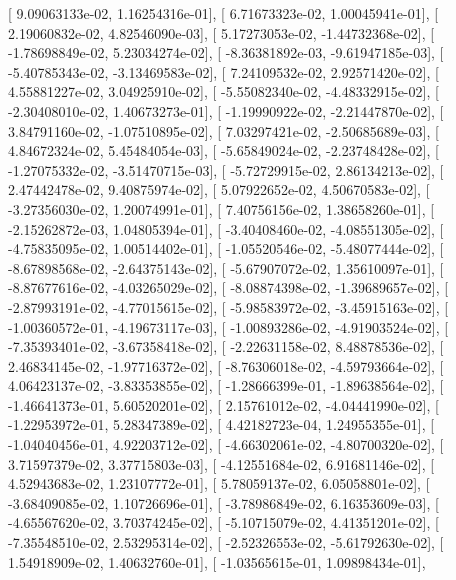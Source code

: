\documentclass{article}
\begin{document}
       [  9.09063133e-02,   1.16254316e-01],
       [  6.71673323e-02,   1.00045941e-01],
       [  2.19060832e-02,   4.82546090e-03],
       [  5.17273053e-02,  -1.44732368e-02],
       [ -1.78698849e-02,   5.23034274e-02],
       [ -8.36381892e-03,  -9.61947185e-03],
       [ -5.40785343e-02,  -3.13469583e-02],
       [  7.24109532e-02,   2.92571420e-02],
       [  4.55881227e-02,   3.04925910e-02],
       [ -5.55082340e-02,  -4.48332915e-02],
       [ -2.30408010e-02,   1.40673273e-01],
       [ -1.19990922e-02,  -2.21447870e-02],
       [  3.84791160e-02,  -1.07510895e-02],
       [  7.03297421e-02,  -2.50685689e-03],
       [  4.84672324e-02,   5.45484054e-03],
       [ -5.65849024e-02,  -2.23748428e-02],
       [ -1.27075332e-02,  -3.51470715e-03],
       [ -5.72729915e-02,   2.86134213e-02],
       [  2.47442478e-02,   9.40875974e-02],
       [  5.07922652e-02,   4.50670583e-02],
       [ -3.27356030e-02,   1.20074991e-01],
       [  7.40756156e-02,   1.38658260e-01],
       [ -2.15262872e-03,   1.04805394e-01],
       [ -3.40408460e-02,  -4.08551305e-02],
       [ -4.75835095e-02,   1.00514402e-01],
       [ -1.05520546e-02,  -5.48077444e-02],
       [ -8.67898568e-02,  -2.64375143e-02],
       [ -5.67907072e-02,   1.35610097e-01],
       [ -8.87677616e-02,  -4.03265029e-02],
       [ -8.08874398e-02,  -1.39689657e-02],
       [ -2.87993191e-02,  -4.77015615e-02],
       [ -5.98583972e-02,  -3.45915163e-02],
       [ -1.00360572e-01,  -4.19673117e-03],
       [ -1.00893286e-02,  -4.91903524e-02],
       [ -7.35393401e-02,  -3.67358418e-02],
       [ -2.22631158e-02,   8.48878536e-02],
       [  2.46834145e-02,  -1.97716372e-02],
       [ -8.76306018e-02,  -4.59793664e-02],
       [  4.06423137e-02,  -3.83353855e-02],
       [ -1.28666399e-01,  -1.89638564e-02],
       [ -1.46641373e-01,   5.60520201e-02],
       [  2.15761012e-02,  -4.04441990e-02],
       [ -1.22953972e-01,   5.28347389e-02],
       [  4.42182723e-04,   1.24955355e-01],
       [ -1.04040456e-01,   4.92203712e-02],
       [ -4.66302061e-02,  -4.80700320e-02],
       [  3.71597379e-02,   3.37715803e-03],
       [ -4.12551684e-02,   6.91681146e-02],
       [  4.52943683e-02,   1.23107772e-01],
       [  5.78059137e-02,   6.05058801e-02],
       [ -3.68409085e-02,   1.10726696e-01],
       [ -3.78986849e-02,   6.16353609e-03],
       [ -4.65567620e-02,   3.70374245e-02],
       [ -5.10715079e-02,   4.41351201e-02],
       [ -7.35548510e-02,   2.53295314e-02],
       [ -2.52326553e-02,  -5.61792630e-02],
       [  1.54918909e-02,   1.40632760e-01],
       [ -1.03565615e-01,   1.09898434e-01],
\end{document}
